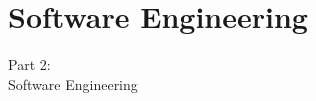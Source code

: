 \section{Software Engineering}
\begin{frame}
    \vspace{25mm}
    \begin{center}
        \Huge{Part 2:\\Software Engineering}
    \end{center}
\end{frame}

\newcommand{\entry}[6]{
  \node[
    rectangle,
    draw=purple,
    anchor=south west,
    align=center,
    minimum height=\cellheight,
    minimum width=(#4-#3)*\cellwidth+((#4-#3)-1)*\cellspacing,
  ]
  (
    #1
  ) at (
    [
      xshift=\xoffset+#3*\cellwidth+(#3-1)*\cellspacing,
      yshift=\yoffset+(#2-1)*\cellheight+(#2-2)*\cellspacing,
    ] semorigo)
  {
    #5\\\textcolor{orange}{#6 ECTS}
  }
}

